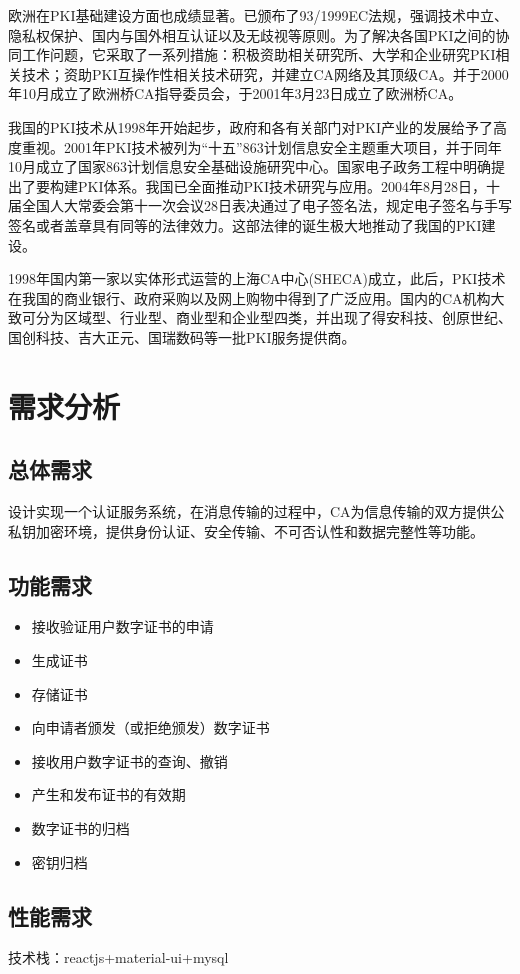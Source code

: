 \documentclass{ctexart}
\begin{document}
欧洲在PKI基础建设方面也成绩显著。已颁布了93/1999EC法规，强调技术中立、隐私权保护、国内与国外相互认证以及无歧视等原则。为了解决各国PKI之间的协同工作问题，它采取了一系列措施：积极资助相关研究所、大学和企业研究PKI相关技术；资助PKI互操作性相关技术研究，并建立CA网络及其顶级CA。并于2000年10月成立了欧洲桥CA指导委员会，于2001年3月23日成立了欧洲桥CA。

我国的PKI技术从1998年开始起步，政府和各有关部门对PKI产业的发展给予了高度重视。2001年PKI技术被列为“十五”863计划信息安全主题重大项目，并于同年10月成立了国家863计划信息安全基础设施研究中心。国家电子政务工程中明确提出了要构建PKI体系。我国已全面推动PKI技术研究与应用。2004年8月28日，十届全国人大常委会第十一次会议28日表决通过了电子签名法，规定电子签名与手写签名或者盖章具有同等的法律效力。这部法律的诞生极大地推动了我国的PKI建设。

1998年国内第一家以实体形式运营的上海CA中心(SHECA)成立，此后，PKI技术在我国的商业银行、政府采购以及网上购物中得到了广泛应用。国内的CA机构大致可分为区域型、行业型、商业型和企业型四类，并出现了得安科技、创原世纪、国创科技、吉大正元、国瑞数码等一批PKI服务提供商。
\section{需求分析}
\subsection{总体需求}
设计实现一个认证服务系统，在消息传输的过程中，CA为信息传输的双方提供公私钥加密环境，提供身份认证、安全传输、不可否认性和数据完整性等功能。

\subsection{功能需求}
\begin{itemize}
    \item 接收验证用户数字证书的申请
    \item 生成证书
    \item 存储证书
    \item 向申请者颁发（或拒绝颁发）数字证书
    \item 接收用户数字证书的查询、撤销
    \item 产生和发布证书的有效期
    \item 数字证书的归档
    \item 密钥归档
\end{itemize}

\subsection{性能需求}
技术栈：reactjs+material-ui+mysql
\end{document}
